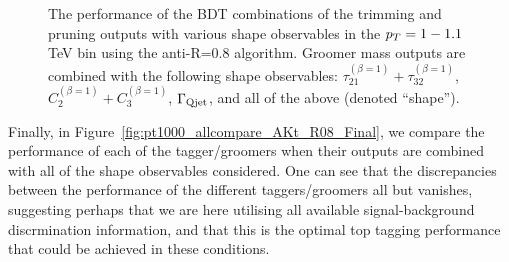 \begin{figure}
\centering
{}
\caption{The performance of the BDT combinations of the trimming and pruning outputs with various shape observables in the $p_T = 1-1.1$ TeV bin using the anti-\kT R=0.8 algorithm. Groomer mass outputs are combined with the following shape observables: $\tau_{21}^{(\beta=1)}+\tau_{32}^{(\beta=1)}$, $C_{2}^{(\beta=1)}+C_{3}^{(\beta=1)}$, $\Gamma_{\rm Qjet}$, and all of the above (denoted ``shape'').}
\label{fig:pt1000_allcompare_AKt_R08_GroomSh}
\end{figure}

Finally, in Figure~\ref{fig:pt1000_allcompare_AKt_R08_Final}, we compare the performance of each of the tagger/groomers when their outputs are combined with all of the shape observables considered. One can see that the discrepancies between the performance of the different taggers/groomers all but vanishes, suggesting perhaps that we are here utilising all available signal-background discrmination information, and that this is the optimal top tagging performance that could be achieved in these conditions. 

